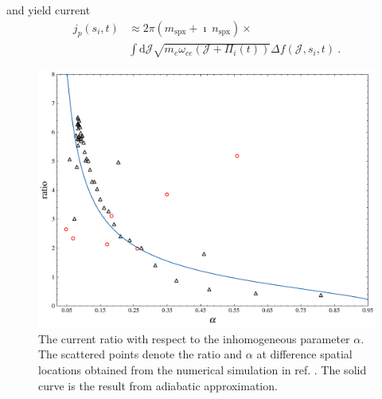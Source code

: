 and yield current 
\begin{equation}\label{eq.adi_J}
    \begin{aligned}
    j_p(s_i,t) &\approx 2 \pi\left(m_\mathrm{s p x}+\imath ~ n_\mathrm{s p x}\right) \times 
    \\
    &\int \mathrm{d} \mathcal{J} \sqrt{m_e \omega_{c e}(\mathcal{J}+\Pi_i(t))} \Delta f(\mathcal{J},s_i,t) ~.
    \end{aligned}
\end{equation}

\begin{figure}
    \centering
    \includegraphics[scale=0.5]{img/fig_adiabatic.pdf}
    \caption{The current ratio with respect to the inhomogeneous parameter $\alpha$. The scattered points denote the ratio and $\alpha$ at difference spatial locations obtained from the numerical simulation in ref. \cite{zheng2023b}. 
    The solid curve is the result from adiabatic approximation.
    }
    \label{fig.adiabatic}
\end{figure}

